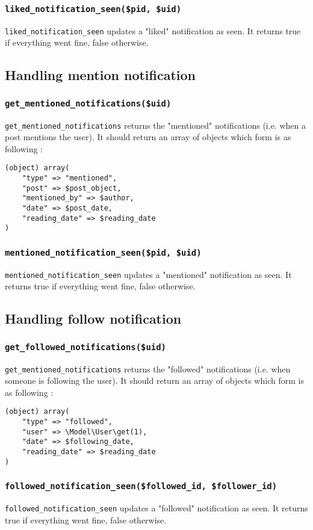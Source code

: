 \documentclass[twoside,a4paper,12pt]{article}
\begin{document}
\subsubsection{\texttt{liked\_notification\_seen(\$pid, \$uid)}}
\texttt{liked\_notification\_seen} updates a "liked" notification as seen. It returns true if everything went fine, false otherwise.

\subsection{Handling mention notification}

\subsubsection{\texttt{get\_mentioned\_notifications(\$uid)}}
\texttt{get\_mentioned\_notifications} returns the "mentioned" notifications (i.e. when a post mentions the user). It should return an array of objects which form is as following :
\begin{lstlisting}
(object) array(
    "type" => "mentioned",
    "post" => $post_object,
    "mentioned_by" => $author,
    "date" => $post_date,
    "reading_date" => $reading_date
)
\end{lstlisting}

\subsubsection{\texttt{mentioned\_notification\_seen(\$pid, \$uid)}}
\texttt{mentioned\_notification\_seen} updates a "mentioned" notification as seen. It returns true if everything went fine, false otherwise.

\subsection{Handling follow notification}

\subsubsection{\texttt{get\_followed\_notifications(\$uid)}}
\texttt{get\_mentioned\_notifications} returns the "followed" notifications (i.e. when someone is following the user). It should return an array of objects which form is as following :

\begin{lstlisting}
(object) array(
    "type" => "followed",
    "user" => \Model\User\get(1),
    "date" => $following_date,
    "reading_date" => $reading_date
)
\end{lstlisting}

\subsubsection{\texttt{followed\_notification\_seen(\$followed\_id, \$follower\_id)}}
\texttt{followed\_notification\_seen} updates a "followed" notification as seen. It returns true if everything went fine, false otherwise.
\end{document}
